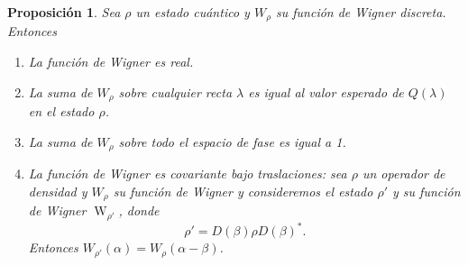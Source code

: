\documentclass[a4paper]{report}
\DeclareMathOperator{\W}{W}
\newtheorem{proposition}{Proposición}
\begin{document}
  \begin{proposition}
    Sea $\rho$ un estado cuántico y $W_\rho$ su función de
    Wigner discreta. Entonces
    \begin{enumerate}
      \item La función de Wigner es real.
      \item La suma de $W_\rho$ sobre cualquier recta
        $\lambda$ es igual al valor esperado de $Q(\lambda)$ 
        en el estado $\rho$.
      \item La suma de $W_\rho$ sobre todo el espacio de fase
        es igual a 1.
      \item La función de Wigner es covariante bajo
        traslaciones: sea $\rho$ un operador de densidad y
        $W_\rho$ su función de Wigner y consideremos el
        estado $\rho'$ y su función de Wigner $\W_{\rho'}$,
        donde
        \[
          \rho '
          = D(\beta) \rho D(\beta)^{*}.
        \] 
        Entonces $W_{\rho'}(\alpha) =
        W_{\rho}(\alpha-\beta)$.
    \end{enumerate}
  \end{proposition}
\end{document}
